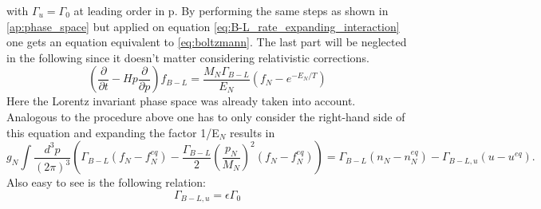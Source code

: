 with $\Gamma_u=\Gamma_0$ at leading order in p. \newline\indent
By performing the same steps as shown in \ref{ap:phase_space} but applied on equation \eqref{eq:B-L_rate_expanding_interaction} one gets an equation equivalent to \eqref{eq:boltzmann}. The last part will be neglected in the following since it doesn't matter considering relativistic corrections.
\begin{equation*}
\left(\frac{\partial}{\partial t}-Hp\frac{\partial}{\partial p}\right)f_{B-L}=\frac{M_N\Gamma_{B-L}}{E_N}\left(f_N-e^{-E_N/T}\right)
\end{equation*}
Here the Lorentz invariant phase space was already taken into account.\newline\indent
Analogous to the procedure above one has to only consider the right-hand side of this equation and expanding the factor 1/E$_N$ results in
\begin{equation*}
g_N\int \frac{d^3p}{(2\pi)^3}\left(\Gamma_{B-L}\left(f_N-f_N^{eq}\right)-\frac{\Gamma_{B-L}}{2}\left(\frac{p_N}{M_N}\right)^2\left(f_N-f_N^{eq}\right)\right)=\Gamma_{B-L}\left(n_N-n_N^{eq}\right)-\Gamma_{B-L,u}\left(u-u^{eq}\right).
\end{equation*}
Also easy to see is the following relation:
\begin{equation*}
	\Gamma_{B-L,u}=\epsilon\Gamma_0
\end{equation*}
